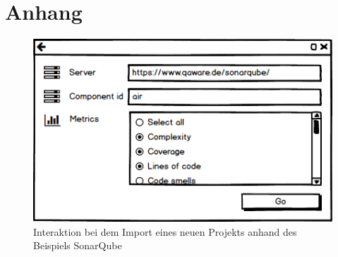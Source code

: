 \chapter{Anhang}

\begin{figure}[htb]
  \includegraphics[width=.8\textwidth]{figures/sonarqube-import}
  \caption{Interaktion bei dem Import eines neuen Projekts anhand des Beispiels SonarQube}
  \label{fig:sonarqube-import}
\end{figure}

